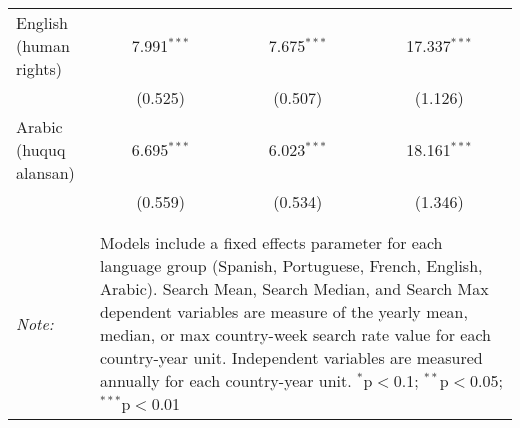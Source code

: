 \begin{table}[!htbp]
\begin{tabular}{@{\extracolsep{5pt}}lccc}
  English (human rights) & 7.991$^{***}$ & 7.675$^{***}$ & 17.337$^{***}$ \\ 
  & (0.525) & (0.507) & (1.126) \\ 
  Arabic (huquq alansan) & 6.695$^{***}$ & 6.023$^{***}$ & 18.161$^{***}$ \\ 
  & (0.559) & (0.534) & (1.346) \\ 
 \hline \\[-1.8ex] 
\hline 
\hline \\[-1.8ex] 
\textit{Note:}  & \multicolumn{3}{l}{\parbox[t]{8cm}{Models include a fixed effects parameter for each language group (Spanish, Portuguese, French, English, Arabic). Search Mean, Search Median, and Search Max dependent variables are measure of the yearly mean, median, or max country-week search rate value for each country-year unit. Independent variables are measured annually for each country-year unit. $^{*}$p$<$0.1; $^{**}$p$<$0.05; $^{***}$p$<$0.01}} \\ 
\end{tabular} 
\end{table} 
